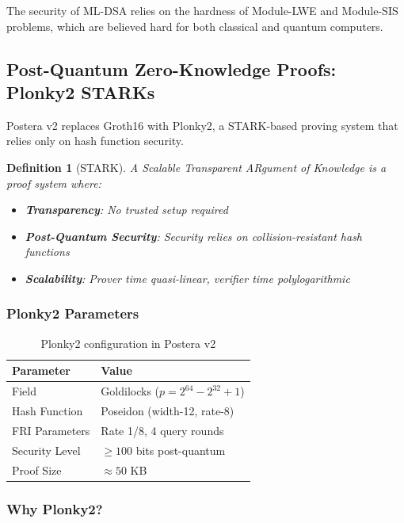\documentclass[11pt,a4paper]{article}
\newtheorem{definition}{Definition}
\begin{document}
The security of ML-DSA relies on the hardness of Module-LWE and Module-SIS problems, which are believed hard for both classical and quantum computers.

\subsection{Post-Quantum Zero-Knowledge Proofs: Plonky2 STARKs}

Postera v2 replaces Groth16 with Plonky2, a STARK-based proving system that relies only on hash function security.

\begin{definition}[STARK]
A Scalable Transparent ARgument of Knowledge is a proof system where:
\begin{itemize}
    \item \textbf{Transparency}: No trusted setup required
    \item \textbf{Post-Quantum Security}: Security relies on collision-resistant hash functions
    \item \textbf{Scalability}: Prover time quasi-linear, verifier time polylogarithmic
\end{itemize}
\end{definition}

\subsubsection{Plonky2 Parameters}

\begin{table}[h]
\centering
\begin{tabular}{ll}
\toprule
Parameter & Value \\
\midrule
Field & Goldilocks ($p = 2^{64} - 2^{32} + 1$) \\
Hash Function & Poseidon (width-12, rate-8) \\
FRI Parameters & Rate 1/8, 4 query rounds \\
Security Level & $\geq 100$ bits post-quantum \\
Proof Size & $\approx 50$ KB \\
\bottomrule
\end{tabular}
\caption{Plonky2 configuration in Postera v2}
\end{table}

\subsubsection{Why Plonky2?}
\end{document}
